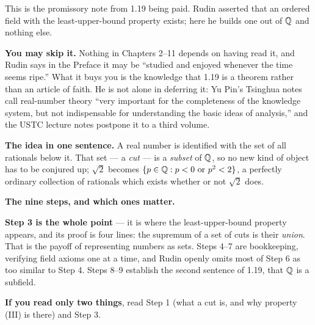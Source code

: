 
\begin{roadmap}
This is the promissory note from 1.19 being paid. Rudin asserted that an ordered
field with the least-upper-bound property exists; here he builds one out of
$\mathbb{Q}$ and nothing else.

\medskip
\raggedright
\textbf{You may skip it.} Nothing in Chapters 2--11 depends on having read it,
and Rudin says in the Preface it may be ``studied and enjoyed whenever the time
seems ripe.'' What it buys you is the knowledge that 1.19 is a theorem rather
than an article of faith. He is not alone in deferring it: Yu Pin's Tsinghua
notes call real-number theory ``very important for the completeness of the
knowledge system, but not indispensable for understanding the basic ideas of
analysis,'' and the USTC lecture notes postpone it to a third volume.

\medskip
\textbf{The idea in one sentence.} A real number is identified with the set of
all rationals below it. That set --- a \emph{cut} --- is a \emph{subset} of
$\mathbb{Q}$, so no new kind of object has to be conjured up; $\sqrt2$ becomes
$\{p \in \mathbb{Q} : p<0 \text{ or } p^2<2\}$, a perfectly ordinary collection of
rationals which exists whether or not $\sqrt 2$ does.

\medskip
\textbf{The nine steps, and which ones matter.}

\medskip
\centering
{}

\medskip
\raggedright
\textbf{Step 3 is the whole point} --- it is where the least-upper-bound
property appears, and its proof is four lines: the supremum of a set of cuts is
their \emph{union}. That is the payoff of representing numbers as sets. Steps
4--7 are bookkeeping, verifying field axioms one at a time, and Rudin openly
omits most of Step 6 as too similar to Step 4. Steps 8--9 establish the second
sentence of 1.19, that $\mathbb{Q}$ is a subfield.

\medskip
\textbf{If you read only two things}, read Step 1 (what a cut is, and why
property (III) is there) and Step 3.
\end{roadmap}

